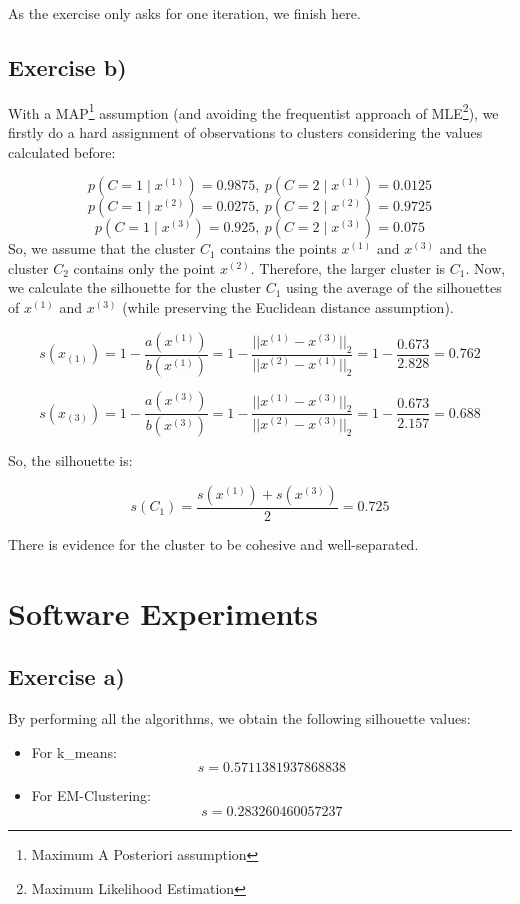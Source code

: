 \documentclass{article}
\begin{document}
As the exercise only asks for one iteration, we finish here.

\newpage
\subsection{Exercise b)}

With a MAP\footnote{Maximum A Posteriori assumption} assumption (and avoiding the frequentist approach of MLE\footnote{Maximum Likelihood Estimation}), we firstly do a hard assignment of observations to clusters considering the values calculated before:

\[
p(C = 1 \mid x^{(1)}) = 0.9875, \: p(C = 2 \mid x^{(1)}) = 0.0125
\]
\[
p(C = 1 \mid x^{(2)}) = 0.0275, \: p(C = 2 \mid x^{(2)}) = 0.9725
\]
\[
p(C = 1 \mid x^{(3)}) = 0.925, \: p(C = 2 \mid x^{(3)}) = 0.075
\]
\newline
So, we assume that the cluster \(C_1\) contains the points \(x^{(1)}\) and \(x^{(3)}\) and the cluster
\(C_2\) contains only the point \(x^{(2)}\). Therefore, the larger cluster is \(C_1\).
\newline
Now, we calculate the silhouette for the cluster \(C_1\) using the average of the silhouettes of \(x^{(1)}\) and \(x^{(3)}\) (while preserving the Euclidean distance assumption).

\[
s(x_{(1)}) = 1 - \frac{a(x^{(1)})}{b(x^{(1)})} = 1 - \frac{{||x^{(1)} - x^{(3)}||}_2}{{||x^{(2)} - x^{(1)}||}_2} = 1 - \frac{0.673}{2.828} = 0.762
\]

\[
s(x_{(3)}) = 1 - \frac{a(x^{(3)})}{b(x^{(3)})} = 1 - \frac{{||x^{(1)} - x^{(3)}||}_2}{{||x^{(2)} - x^{(3)}||}_2} = 1 - \frac{0.673}{2.157} = 0.688
\]

So, the silhouette is:

\[
s(C_1) = \frac{s(x^{(1)}) + s(x^{(3)})}{2} = 0.725
\]

There is evidence for the cluster to be cohesive and well-separated.

\newpage

\section{Software Experiments}
\subsection{Exercise a)}

By performing all the algorithms, we obtain the following silhouette values:

\begin{itemize}
    \item For k\_means: 
    \[ s = 0.5711381937868838 \]
    
    \item For EM-Clustering: 
    \[ s = 0.283260460057237\]
\end{itemize}
\end{document}
